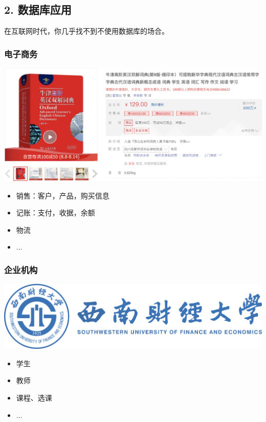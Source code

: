 \documentclass[aspectratio=169, 14pt]{beamer}
\begin{document}
\begin{frame}
	\section{\textcolor{darkmidnightblue}{2. 数据库应用}}

	在互联网时代，你几乎找不到不使用数据库的场合。
\end{frame}

\begin{frame}
	\frametitle{电子商务}
	\begin{center}
		\includegraphics[width=.55\paperwidth]{image/dict}
	\end{center}

	\begin{itemize}
		\item 销售：客户，产品，购买信息
		\item 记账：支付，收据，余额
		\item 物流
		\item ...
	\end{itemize}
\end{frame}

\begin{frame}
	\frametitle{企业机构}

	\includegraphics[width=.55\paperwidth]{image/swufe}
	\begin{itemize}
		\item 学生
		\item 教师
		\item 课程、选课
		\item ...
	\end{itemize}


\end{frame}
\end{document}
